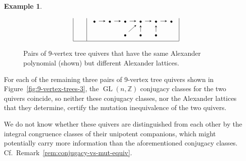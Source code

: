 \documentclass[11pt, letterpaper]{amsart}
\theoremstyle{definition}
\newtheorem{example}[theorem]{Example}
\numberwithin{equation}{section}
\def\ZZ{{\mathbb Z}}
\def\GL{{\operatorname{GL}}}
\begin{document}
\begin{example}
\begin{figure}[ht]
\begin{equation*}
\begin{array}{|l|l|}
\quad & 
\begin{tikzcd}[arrows={-stealth}, sep=1em]
  \scriptstyle\bullet  \arrow[r]   & \scriptstyle\bullet  \arrow[r] & \scriptstyle\bullet \arrow[r] & \scriptstyle\bullet \arrow[r] & \scriptstyle\bullet \arrow[r] & \scriptstyle\bullet \\
 & & \scriptstyle\bullet  \arrow[ur]  & \scriptstyle\bullet \arrow[u] & \scriptstyle\bullet \arrow[u] & 
\end{tikzcd}
\\[15pt] 
\hline
\end{array}
\end{equation*}
\caption{Pairs of 9-vertex tree quivers that have the same Alexander polynomial (shown) but different Alexander lattices.
}
\vspace{-10pt}
\label{fig:9-vertex-trees-2}
\end{figure}

For each of the remaining three pairs of 9-vertex tree quivers shown in Figure~\ref{fig:9-vertex-trees-3}, 
the $\GL(n,\ZZ)$ conjugacy classes for the two quivers coincide,
so neither these conjugacy classes, nor the Alexander lattices that they determine, 
certify the mutation inequivalence of the two quivers. 

We do not know whether these quivers are distinguished from each other 
by the integral congruence classes of their unipotent companions,
which might potentially carry more information than the aforementioned conjugacy classes.
Cf.\ Remark~\ref{rem:conjugacy-vs-mut-equiv}.
\end{example}
\end{document}
